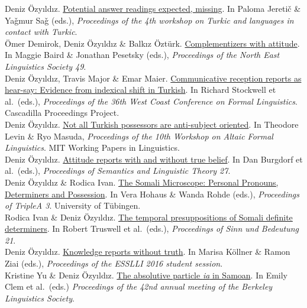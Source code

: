 \documentclass[11pt, a4paper]{article} %
\newcommand{\years}[1]{\marginnote{\scriptsize #1}} %
\newcommand{\me}{Deniz \"Ozy\i{}ld\i{}z}
\newcommand{\btit}{\textit}
\begin{document}
\years{2019} \me. \href{https://semanticsarchive.net/Archive/TQzZWUwO/}{Potential answer readings expected, missing}. In Paloma Jereti\v{c} \& Ya\v{g}mur Sa\v{g} (eds.), \btit{Proceedings of the 4th workshop on Turkic and languages in contact with Turkic}.\\[.25em]
\years{} \"Omer Demirok, Deniz \"Ozy\i{}ld\i{}z \& Balk\i{}z \"Ozt\"urk. \href{http://deniz.fr/pdfs/2018-nels-paper.pdf}{Complementizers with attitude}. In Maggie Baird \& Jonathan Pesetsky (eds.), \btit{Proceedings of the North East Linguistics Society 49}.\\[.25em]
\years{2018} \me, Travis Major \& Emar Maier. \href{http://deniz.fr/pdfs/2018-wccfl-paper.pdf}{Communicative reception reports as hear-say: Evidence from indexical shift in Turkish}. In Richard Stockwell et al.\ (eds.), %
\btit{Proceedings of the 36th West Coast Conference on Formal Linguistics}. Cascadilla Proceedings Project.\\[.25em]
\me. \href{http://deniz.fr/pdfs/possessives_paper.pdf}{Not all Turkish possessors are anti-subject oriented}. In Theodore Levin \& Ryo Masuda, \btit{Proceedings of the 10th Workshop on Altaic Formal Linguistics}. MIT Working Papers in Linguistics.\\[.25em]
\newpage
\years{2017} \me. \href{https://journals.linguisticsociety.org/proceedings/index.php/SALT/article/view/27.397/3886}{Attitude reports with and without true belief}. In Dan Burgdorf et al.\ (eds.), %
\btit{Proceedings of Semantics and Linguistic Theory 27}.\\[.25em]
\me{} \& Rodica Ivan.  \href{http://deniz.fr/pdfs/2017-ozyildiz-ivan-aaa.pdf}{The Somali Microscope: Personal Pronouns, Determiners and Possession}. In Vera Hohaus \& Wanda Rohde (eds.), \btit{Proceedings of TripleA 3}. University of T\"ubingen. \\[.25em]
Rodica Ivan \& Deniz \"Ozy\i{}ld\i{}z. \href{http://deniz.fr/pdfs/2017-ivan-ozyildiz-sub.pdf}{The temporal presuppositions of Somali definite determiners}. In Robert Truswell et al.\ (eds.), \btit{Proceedings of Sinn und Bedeutung 21}. \\[.25em]
\years{2016} \me.  \href{http://deniz.fr/pdfs/2016-esslli.pdf}{Knowledge reports without truth}. In Marisa K\"ollner \& Ramon Ziai (eds.), \btit{Proceedings of  the ESSLLI 2016 student session}.\\[.25em]
Kristine Yu \& Deniz \"Ozy\i{}ld\i{}z.  \href{http://deniz.fr/pdfs/2016-yu-ozyildiz-bls.pdf}{The absolutive particle \textit{ia} in Samoan}. In Emily Clem et al.\ (eds.) \btit{Proceedings of the 42nd annual meeting of the Berkeley Linguistics Society}.
\end{document}
